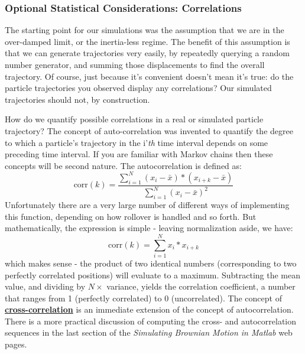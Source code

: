 \documentclass{../lab}
\begin{document}

\subsubsection{Optional Statistical Considerations: Correlations}

The starting point for our simulations was the assumption that we are in the over-damped limit, or the inertia-less regime. The benefit of this assumption is that we can generate trajectories very easily, by repeatedly querying a random number generator, and summing those displacements to find the overall trajectory. Of course, just because it's convenient doesn't mean it's true: do the particle trajectories you observed display any correlations? Our simulated trajectories should not, by construction.

How do we quantify possible correlations in a real or simulated particle trajectory? The concept of auto-correlation was invented to quantify the degree to which a particle's trajectory in the i'\emph{th} time interval depends on some preceding time interval. If you are familiar with Markov chains then these concepts will be second nature. The autocorrelation is defined as:
\begin{equation}
    \textrm{corr}(k) = \frac{\sum_{i=1}^N(x_i-\bar{x})*(x_{i+k}-\bar{x})}{\sum_{i=1}^N(x_i-\bar{x})^2}
\end{equation}
Unfortunately there are a very large number of different ways of implementing this function, depending on how rollover is handled and so forth. But mathematically, the expression is simple - leaving normalization aside, we have:
\begin{equation}
    \textrm{corr}(k) = \sum_{i=1}^N x_i*x_{i+k}
\end{equation}
which makes sense - the product of two identical numbers (corresponding to two perfectly correlated positions) will evaluate to a maximum. Subtracting the mean value, and dividing by $N \times$ variance, yields the correlation coefficient, a number that ranges from 1 (perfectly correlated) to 0 (uncorrelated). The concept of \href{http://physics111.lib.berkeley.edu/Physics111/Reprints/OTZ/biowikipedia.pdf}{\textbf{cross-correlation}} is an immediate extension of the concept of autocorrelation. There is a more practical discussion of computing the cross- and autocorrelation sequences in the last section of the \emph{Simulating Brownian Motion in Matlab }web pages.
\end{document}
